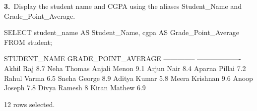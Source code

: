 \noindent\begin{minipage}{\linewidth}
\begingroup{}
{\fontsize{14}{17}\selectfont\textbf{3.}}\ Display the student name and CGPA using the aliases Student\_Name and Grade\_Point\_Average.\par
\endgroup\vspace{12pt}


\begin{sqlcode}
SELECT student_name AS Student_Name, cgpa AS Grade_Point_Average
FROM student;
\end{sqlcode}

\vspace{18pt}


\begin{sqlout}[fontsize=\small]
STUDENT_NAME    GRADE_POINT_AVERAGE
--------------  -------------------
Akhil Raj       8.7
Neha Thomas
Anjali Menon    9.1
Arjun Nair      8.4
Aparna Pillai   7.2
Rahul Varma     6.5
Sneha George    8.9
Aditya Kumar    5.8
Meera Krishnan  9.6
Anoop Joseph    7.8
Divya Ramesh    8
Kiran Mathew    6.9

12 rows selected.
\end{sqlout}
\end{minipage}\par\vspace{24pt}

